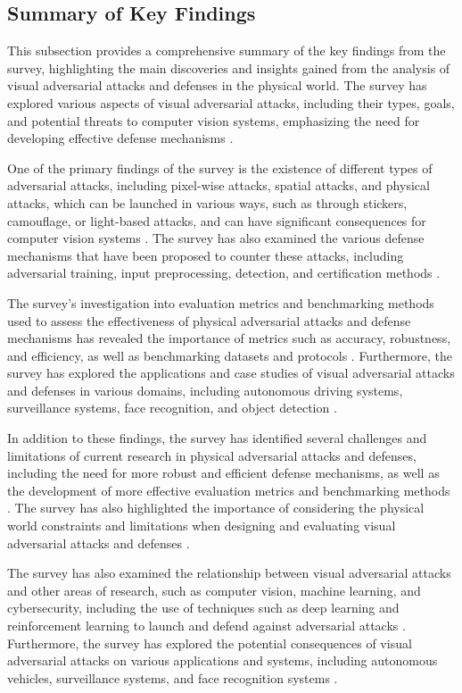 \documentclass[11pt]{article}
\begin{document}
\subsection{Summary of Key Findings}

This subsection provides a comprehensive summary of the key findings from the survey, highlighting the main discoveries and insights gained from the analysis of visual adversarial attacks and defenses in the physical world. The survey has explored various aspects of visual adversarial attacks, including their types, goals, and potential threats to computer vision systems, emphasizing the need for developing effective defense mechanisms \cite{ref120}.

One of the primary findings of the survey is the existence of different types of adversarial attacks, including pixel-wise attacks, spatial attacks, and physical attacks, which can be launched in various ways, such as through stickers, camouflage, or light-based attacks, and can have significant consequences for computer vision systems \cite{ref44}. The survey has also examined the various defense mechanisms that have been proposed to counter these attacks, including adversarial training, input preprocessing, detection, and certification methods \cite{ref13}.

The survey's investigation into evaluation metrics and benchmarking methods used to assess the effectiveness of physical adversarial attacks and defense mechanisms has revealed the importance of metrics such as accuracy, robustness, and efficiency, as well as benchmarking datasets and protocols \cite{ref8}. Furthermore, the survey has explored the applications and case studies of visual adversarial attacks and defenses in various domains, including autonomous driving systems, surveillance systems, face recognition, and object detection \cite{ref34}.

In addition to these findings, the survey has identified several challenges and limitations of current research in physical adversarial attacks and defenses, including the need for more robust and efficient defense mechanisms, as well as the development of more effective evaluation metrics and benchmarking methods \cite{ref150}. The survey has also highlighted the importance of considering the physical world constraints and limitations when designing and evaluating visual adversarial attacks and defenses \cite{ref151}.

The survey has also examined the relationship between visual adversarial attacks and other areas of research, such as computer vision, machine learning, and cybersecurity, including the use of techniques such as deep learning and reinforcement learning to launch and defend against adversarial attacks \cite{ref140}. Furthermore, the survey has explored the potential consequences of visual adversarial attacks on various applications and systems, including autonomous vehicles, surveillance systems, and face recognition systems \cite{ref152}.
\end{document}
